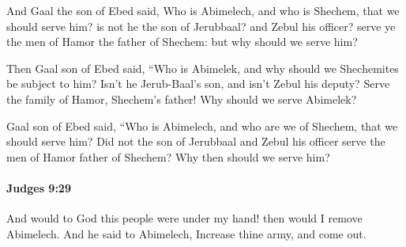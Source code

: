 			\begin{versebox}
					\item[BHS] 
					\item[ASV] And Gaal the son of Ebed said, Who is Abimelech, and who is Shechem, that we should serve him? is not he the son of Jerubbaal? and Zebul his officer? serve ye the men of Hamor the father of Shechem: but why should we serve him?
					\item[NIV] Then Gaal son of Ebed said, “Who is Abimelek, and why should we Shechemites be subject to him? Isn’t he Jerub-Baal’s son, and isn’t Zebul his deputy? Serve the family of Hamor, Shechem’s father! Why should we serve Abimelek?
					\item[NRSV] Gaal son of Ebed said, “Who is Abimelech, and who are we of Shechem, that we should serve him? Did not the son of Jerubbaal and Zebul his officer serve the men of Hamor father of Shechem? Why then should we serve him?
			\end{versebox}

		\paragraph{Judges 9:29} %
			\label{JUDGES-9-29}

			And would to God this people were under my hand! then would I remove Abimelech. And he said to Abimelech, Increase thine army, and come out.


